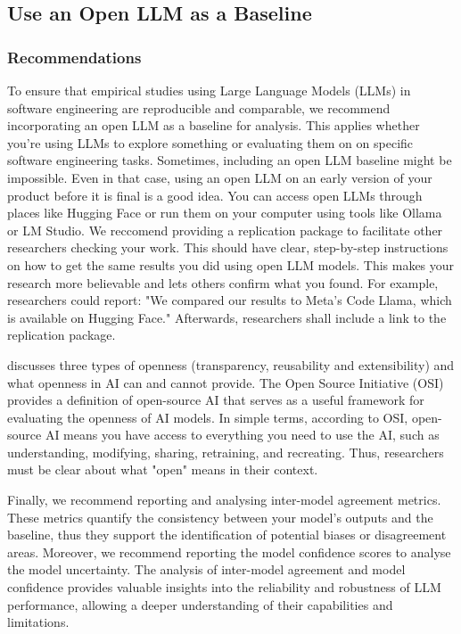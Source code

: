 \documentclass[11pt]{article}
\begin{document}
\subsection{Use an Open LLM as a Baseline}

\subsubsection{Recommendations}

To ensure that empirical studies using Large Language Models (LLMs) in software engineering are reproducible and comparable, we recommend incorporating an open LLM as a baseline for analysis. This applies whether you're using LLMs to explore something or evaluating them on on specific software engineering tasks. 
Sometimes, including an open LLM baseline might be impossible. Even in that case, using an open LLM on an early version of your product before it is final is a good idea.
You can access open LLMs through places like Hugging Face or run them on your computer using tools like Ollama or LM Studio. 
We reccomend providing a replication package to facilitate other researchers checking your work. This should have clear, step-by-step instructions on how to get the same results you did using open LLM models. This makes your research more believable and lets others confirm what you found. For example, researchers could report: "We compared our results to Meta's Code Llama, which is available on Hugging Face." Afterwards, researchers shall include a link to the replication package.

\cite{widder2024open} discusses three types of openness (transparency, reusability and extensibility) and  what openness in AI can and cannot provide. The Open Source Initiative (OSI) \cite{OSIAI2024} provides a definition of open-source AI that serves as a useful framework for evaluating the openness of AI models. In simple terms, according to OSI, open-source AI means you have access to everything you need to use the AI, such as understanding, modifying, sharing, retraining, and recreating. Thus, researchers must be clear about what "open" means in their context.

Finally, we recommend reporting and analysing inter-model agreement metrics. These metrics quantify the consistency between your model's outputs and the baseline, thus they support the identification of potential biases or disagreement areas.  Moreover, we recommend reporting the model confidence scores to analyse the model uncertainty.  The analysis of inter-model agreement and model confidence provides valuable insights into the reliability and robustness of LLM performance, allowing a deeper understanding of their capabilities and limitations.
\end{document}
